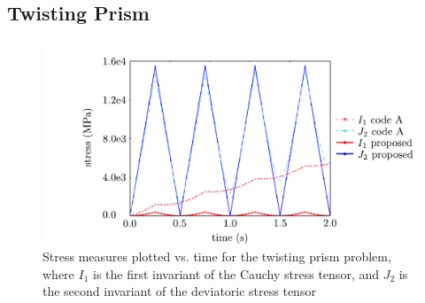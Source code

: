 \FloatBarrier
\subsection{Twisting Prism}

\begin{figure}[!tbhp]
\centering
\includegraphics[scale=0.75]{media/twisted_prism}
\caption{Stress measures plotted vs. time for the twisting prism problem, where $I_1$ is the first invariant of the Cauchy stress tensor, and $J_2$ is the second invariant of the deviatoric stress tensor}
\label{fig.twisted_prism-cm1}
\end{figure}
\negparafig

